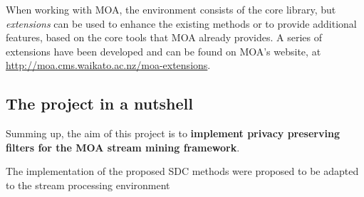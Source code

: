 When working with MOA, the environment consists of the core library, but \textit{extensions}
can be used to enhance the existing methods or to provide additional features, based on
the core tools that MOA already provides. A series of extensions have been developed and can
be found on MOA's website, at \url{http://moa.cms.waikato.ac.nz/moa-extensions}.

\subsection{The project in a nutshell}
\label{Introduction::moa-ppsm::ProjectNutshell}

Summing up, the aim of this project is to \textbf{implement privacy preserving filters
for the MOA stream mining framework}.

The implementation of the proposed SDC methods were proposed to be adapted to the stream processing environment